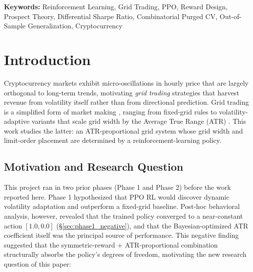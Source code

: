 \documentclass[11pt, a4paper]{article}
\begin{document}
\begin{abstract}
Our contribution is twofold. First, we demonstrate quantitatively that reward
design takes effect along a \emph{trade-off dimension in risk profile}
rather than a single Sharpe ``alpha source.'' Second, we provide quantitative
evidence that Kahneman-Tversky prospect theory confers OOS safety on
RL trading policies. Code and data:
\url{https://github.com/cosmicpotato2047/capstone-rl-trading}.
\end{abstract}

\vspace{1em}
\noindent\textbf{Keywords:} Reinforcement Learning, Grid Trading, PPO,
Reward Design, Prospect Theory, Differential Sharpe Ratio,
Combinatorial Purged CV, Out-of-Sample Generalization, Cryptocurrency

\newpage
\tableofcontents
\newpage

\section{Introduction}
\label{sec:intro}

Cryptocurrency markets exhibit micro-oscillations in hourly price that are
largely orthogonal to long-term trends, motivating \emph{grid trading} strategies
that harvest revenue from volatility itself rather than from directional
prediction. Grid trading is a simplified form of market making
\citep{avellaneda2008market}, ranging from fixed-grid rules to volatility-adaptive
variants that scale grid width by the Average True Range (ATR)
\citep{wilder1978atr}. This work studies the latter: an ATR-proportional grid
system whose grid width and limit-order placement are determined by a
reinforcement-learning policy.

\subsection{Motivation and Research Question}
\label{sec:intro_motivation}

This project ran in two prior phases (Phase 1 and Phase 2) before the work
reported here. Phase 1 hypothesized that PPO RL would discover dynamic
volatility adaptation and outperform a fixed-grid baseline. Post-hoc
behavioral analysis, however, revealed that the trained policy converged to a
near-constant action $[1.0, 0.0]$ (\S\ref{sec:phase1_negative}), and that the
Bayesian-optimized ATR coefficient itself was the principal source of
performance. This negative finding suggested that the symmetric-reward $+$
ATR-proportional combination structurally absorbs the policy's degrees of
freedom, motivating the new research question of this paper:
\end{document}
